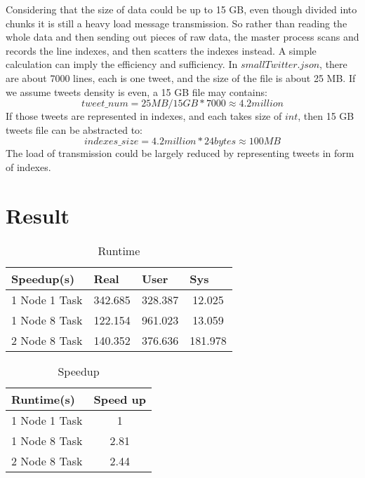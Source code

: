 \documentclass[11pt]{article}
\begin{document}
Considering that the size of data could be up to 15 GB, even though divided into chunks it is still a heavy load message transmission. So rather than reading the whole data and then sending out pieces of raw data, the master process scans and records the line indexes, and then scatters the indexes instead. A simple calculation can imply the efficiency and sufficiency. In $smallTwitter.json$, there are 
about 7000 lines, each is one tweet, and the size of the file is about 25 MB. If we assume tweets density is even, a 15 GB file may contains: \[tweet\_num = 25MB / 15GB * 7000 \approx 4.2million\] If those tweets are represented in indexes, and each takes size of $int$, then 15 GB tweets file can be abstracted to: \[indexes\_size = 4.2million * 24bytes \approx 100MB \] The load of transmission could be largely reduced by representing tweets in form of indexes. 



\section{Result}

\begin{table}[]
\begin{tabular}{c|ccc}
\multicolumn{1}{l|}{Speedup(s)} & \multicolumn{1}{l}{Real} & \multicolumn{1}{l}{User} & \multicolumn{1}{l}{Sys} \\ \hline
1 Node 1 Task                   & 342.685                  & 328.387                  & 12.025                  \\ \hline
1 Node 8 Task                   & 122.154                  & 961.023                  & 13.059                  \\ \hline
2 Node 8 Task                   & 140.352                  & 376.636                  & 181.978                
\end{tabular}
\caption{Runtime}
\label{Runtime}
\end{table}

\begin{table}[]
\begin{tabular}{c|c}
\multicolumn{1}{l|}{Runtime(s)} & \multicolumn{1}{l}{Speed up} \\ \hline
1 Node 1 Task                   & 1                            \\
1 Node 8 Task                   & 2.81                         \\
2 Node 8 Task                   & 2.44                        
\end{tabular}
\caption{Speedup}
\label{Speedup}
\end{table}
\end{document}
